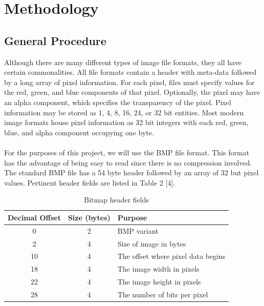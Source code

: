 \documentclass{article} %
\begin{document}
\section{Methodology}
\subsection{General Procedure}
Although there are many different types of image file formats, they all have certain commonalities. All file formats contain a header with meta-data followed by a long array of pixel information. For each pixel, files must specify values for the red, green, and blue components of that pixel. Optionally, the pixel may have an alpha component, which specifies the transparency of the pixel.  Pixel information may be stored as 1, 4, 8, 16, 24, or 32 bit entities. Most modern image formats house pixel information as 32 bit integers with each red, green, blue, and alpha component occupying one byte. \\
\\
For the purposes of this project, we will use the BMP file format.  This format has the advantage of being easy to read since there is no compression involved.  The standard BMP file has a 54 byte header followed by an array of 32 but pixel values.  Pertinent header fields are listed in Table 2 [4].

\begin{table}[h!]
\centering
\begin{tabular}{|c|c|l|}
\hline
\textbf{Decimal Offset} & \textbf{Size (bytes)} & \textbf{Purpose} \\
\hline\hline
0 & 2 & BMP variant \\
2 & 4  & Size of image in bytes \\
10 & 4 & The offset where pixel data begins  \\
18 & 4 & The image width in pixels  \\
22 & 4 & The image height in pixels  \\
28 & 4 & The number of bits per pixel  \\
\hline
\end{tabular}
\caption{Bitmap header fields}
\end{table}
\end{document}
